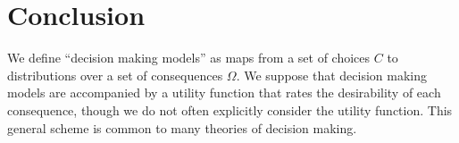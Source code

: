 


\section{Conclusion}

We define ``decision making models'' as maps from a set of choices $C$ to distributions over a set of consequences $\Omega$. We suppose that decision making models are accompanied by a utility function that rates the desirability of each consequence, though we do not often explicitly consider the utility function. This general scheme is common to many theories of decision making.

